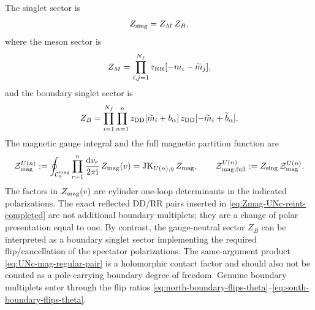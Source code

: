 \documentclass[11pt,a4paper]{article}
\numberwithin{equation}{section}
\theoremstyle{plain}
\theoremstyle{definition}
\theoremstyle{remark}
\newcommand{\ii}{\mathrm{i}}
\newcommand{\dd}{\mathrm{d}}
\begin{document}
The singlet sector is
\begin{equation}
Z_{\rm sing}=Z_M\,Z_B,
\end{equation}
where the meson sector is
\begin{equation}
Z_M=
\prod_{i,j=1}^{N_f}
z_{\rm RR}[-m_i-\widetilde m_j],
\label{eq:ZM-UNc-reint}
\end{equation}
and the boundary singlet sector is
\begin{equation}
Z_B=
\prod_{i=1}^{N_f}\prod_{\alpha=1}^{n}
z_{\rm DD}[\widetilde m_i+b_\alpha]\,
z_{\rm DD}[-\widetilde m_i+\widetilde b_\alpha].
\label{eq:ZB-UNc-reint}
\end{equation}
The magnetic gauge integral and the full magnetic partition function are
\begin{equation}
\mathcal Z_{\rm mag}^{U(n)}
:=
\oint_{\mathcal C_\eta^{\rm mag}}
\prod_{r=1}^{n}\frac{\dd v_r}{2\pi\ii}\,
Z_{\rm mag}(v)
=
\operatorname{JK}_{U(n),\eta}Z_{\rm mag},
\qquad
\mathcal Z_{\rm mag,full}^{U(n)}
:=Z_{\rm sing}\,\mathcal Z_{\rm mag}^{U(n)} .
\label{eq:Zmag-UNc-integral}
\end{equation}
The factors in \(Z_{\rm mag}(v)\) are cylinder one-loop determinants in the indicated polarizations.  The exact reflected DD/RR pairs inserted in \eqref{eq:Zmag-UNc-reint-completed} are not additional boundary multiplets; they are a change of polar presentation equal to one.  By contrast, the gauge-neutral sector \(Z_B\) can be interpreted as a boundary singlet sector implementing the required flip/cancellation of the spectator polarizations.  The same-argument product \eqref{eq:UNc-mag-regular-pair} is a holomorphic contact factor and should also not be counted as a pole-carrying boundary degree of freedom.  Genuine boundary multiplets enter through the flip ratios \eqref{eq:north-boundary-flips-theta}--\eqref{eq:south-boundary-flips-theta}.
\end{document}
